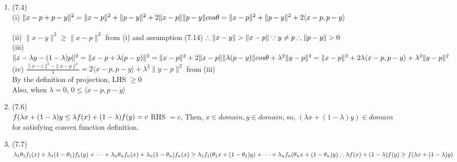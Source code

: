 \documentclass[letterpaper,12pt]{article}
\theoremstyle{definition}
\begin{document}
\begin{enumerate}
	\item (7.4) \\
(i) $\| x - p + p - y \|^2 = \| x - p\|^2 + \|p-y\|^2 + 2\|x-p\|\|p-y\|cos\theta  \\
 =  \| x - p \|^2 + \| p-y \|^2 + 2 \langle x-p, p-y\rangle
$\\
\\
(ii) $ \| x-y \|^2 \geq \|x-p\|^2 $ from (i) and assumption (7.14)$ \\
\therefore \| x-y\| > \|x-p \| \\
\because y \neq p \\
\therefore \|p-y\| >0 \\
$\\
(iii) $\| x - \lambda y - (1- \lambda)p \|^2 = \| x-p + \lambda (p-y)\|^2 \\
= \| x-p\|^2 + 2\| x-p\| \| \lambda(p-y)\|cos\theta  + \lambda^2 \| y-p\|^2 \\
=  \| x-p\|^2 + 2\lambda \langle x-p, p-y\rangle  + \lambda^2 \| y-p\|^2 \\
$ \\
(iv) $\frac{\| x-z \|^2 -\| x-p\|^2}{\lambda} = 2 \langle x-p, p-y \rangle + \lambda^2 \|y-p\|^2 $ from (iii)\\
By the definition of projection, LHS $\geq 0$ \\ Also, when $\lambda = 0$, $0\leq \langle x-p, p-y\rangle$




	\item (7.6) \\
$f(\lambda x + (1-\lambda) y \leq \lambda f(x) + (1 -\lambda) f(y) = c \\
$ RHS $= c$, Then, $x \in domain, y\in domain$, so, $(\lambda x + (1-\lambda)y) \in domain$\\
for satisfying convex function definition.


	\item (7.7) \\
$
\lambda_1 \theta_1f_1(x) + \lambda_1 (1-\theta_1)f_1(y) + \cdots + \lambda_n \theta_nf_n(x) + \lambda_n (1-\theta_n)f_n(x) \geq \lambda_1 f_1(\theta_1x + (1-\theta_1)y) + \cdots + \lambda_n f_n(\theta_nx + (1-\theta_n)y) \\
\therefore \lambda f(x) + (1-\lambda) f(y)  \geq f(\lambda x + (1-\lambda)y) \\
$


\end{enumerate}
\end{document}
